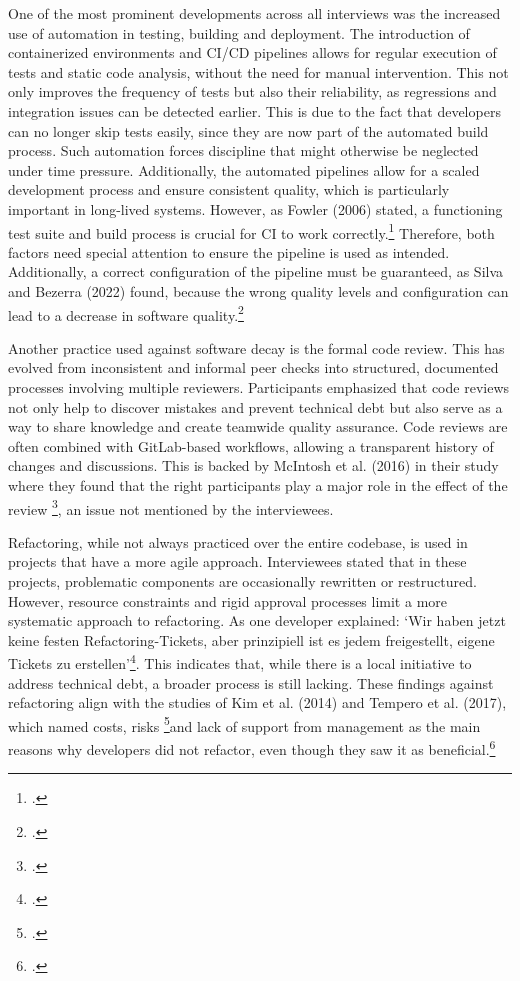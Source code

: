 One of the most prominent developments across all interviews was the increased use of automation in testing, building and deployment. The introduction of containerized environments and CI/CD pipelines allows for regular execution of tests and static code analysis, without the need for manual intervention.
This not only improves the frequency of tests but also their reliability, as regressions and integration issues can be detected earlier. This is due to the fact that developers can no longer skip tests easily, since they are now part of the automated build process.
Such automation forces discipline that might otherwise be neglected under time pressure. Additionally, the automated pipelines allow for a scaled development process and ensure consistent quality, which is particularly important in long-lived systems.
However, as Fowler (2006) stated, a functioning test suite and build process is crucial for CI to work correctly.\footcite[no page number]{fowlerContinuousIntegration2006} Therefore, both factors need special attention to ensure the pipeline is used as intended.
Additionally, a correct configuration of the pipeline must be guaranteed, as Silva and Bezerra (2022) found, because the wrong quality levels and configuration can lead to a decrease in software quality.\footcite[4]{silvaEmpiricalInvestigationInfluence2022}

Another practice used against software decay is the formal code review. This has evolved from inconsistent and informal peer checks into structured, documented processes involving multiple reviewers. Participants emphasized that code reviews not only help to discover mistakes and prevent technical debt but also
serve as a way to share knowledge and create teamwide quality assurance. Code reviews are often combined with GitLab-based workflows, allowing a transparent history of changes and discussions. This is backed by McIntosh et al. (2016) in their study where they found that the right participants play a major role in the effect of the review \footcite[39]{mcintoshEmpiricalStudyImpact2016},
an issue not mentioned by the interviewees.

Refactoring, while not always practiced over the entire codebase, is used in projects that have a more agile approach. Interviewees stated that in these projects, problematic components are occasionally rewritten or restructured. However, resource constraints and rigid approval processes limit a more systematic approach to refactoring.
As one developer explained: `Wir haben jetzt keine festen Refactoring-Tickets, aber prinzipiell ist es jedem freigestellt, eigene Tickets zu erstellen'\footcite[71]{Interview22025}. This indicates that, while there is a local initiative to address technical debt, a broader process is still lacking.
These findings against refactoring align with the studies of Kim et al. (2014) and Tempero et al. (2017), which named costs, risks \footcite[17]{kimEmpiricalStudyRefactoring2014}and lack of support from management as the main reasons why developers did not refactor, even though they saw it as beneficial.\footcite[60]{temperoBarriersRefactoring2017}

